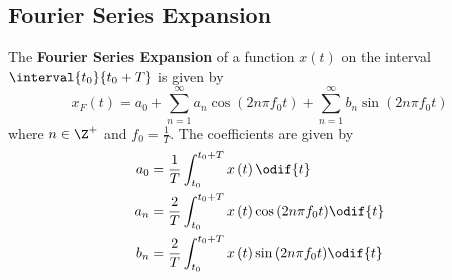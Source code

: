 \documentclass{article}
\begin{document}
\subsection{Fourier Series Expansion}
The \textbf{Fourier Series Expansion} of a function \(x\left( t \right)\) on the interval \(\interval{t_0}{t_0 + T}\)
is given by
\begin{equation*}
    x_F\left( t \right) = a_0 + \sum_{n = 1}^\infty a_n \cos{\left( 2n \pi f_0 t \right)} + \sum_{n = 1}^\infty b_n \sin{\left( 2n \pi f_0 t \right)}
\end{equation*}
where \(n \in \Z^{+}\) and \(f_0 = \frac{1}{T}\). The coefficients are given by
\begin{align*}
    a_0 & = \frac{1}{T} \int_{t_0}^{t_0 + T} x\left( t \right) \odif{t}                                   \\
    a_n & = \frac{2}{T} \int_{t_0}^{t_0 + T} x\left( t \right) \cos{\left( 2n \pi f_0 t \right)} \odif{t} \\
    b_n & = \frac{2}{T} \int_{t_0}^{t_0 + T} x\left( t \right) \sin{\left( 2n \pi f_0 t \right)} \odif{t}
\end{align*}
\end{document}
